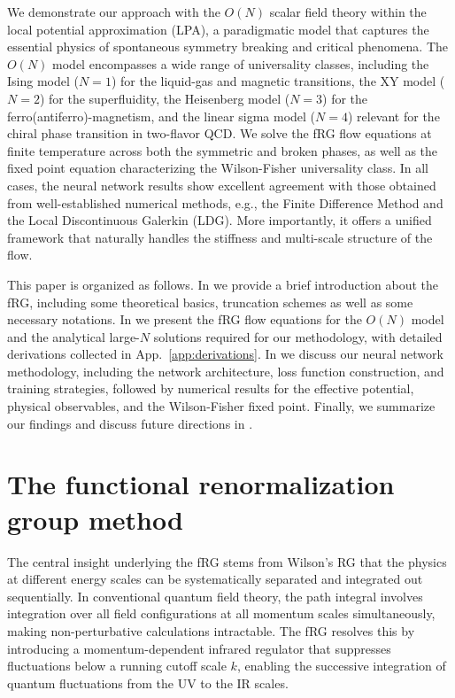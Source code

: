 \documentclass[reprint,twocolumn,superscriptaddress,preprintnumbers,amsmath,amssymb,aps,prd,floatfix]{revtex4-2}
\def\App#1{App.~\ref{#1}}
\begin{document}
We demonstrate our approach with the $O(N)$ scalar field theory within the local potential approximation (LPA), a paradigmatic model that captures the essential physics of spontaneous symmetry breaking and critical phenomena. The $O(N)$ model encompasses a wide range of universality classes, including the Ising model ($N=1$) for the liquid-gas and magnetic transitions, the XY model ($N=2$) for the superfluidity, the Heisenberg model ($N=3$) for the ferro(antiferro)-magnetism, and the linear sigma model ($N=4$) relevant for the chiral phase transition in two-flavor QCD. We solve the fRG flow equations at finite temperature across both the symmetric and broken phases, as well as the fixed point equation characterizing the Wilson-Fisher universality class. In all cases, the neural network results show excellent agreement with those obtained from well-established numerical methods, e.g., the Finite Difference Method and the Local Discontinuous Galerkin (LDG). More importantly, it offers a unified framework that naturally handles the stiffness and multi-scale structure of the flow.

This paper is organized as follows. In  we provide a brief introduction about the fRG, including some theoretical basics, truncation schemes as well as some necessary notations. In  we present the fRG flow equations for the $O(N)$ model and the analytical large-$N$ solutions required for our methodology, with detailed derivations collected in \App{app:derivations}. In  we discuss our neural network methodology, including the network architecture, loss function construction, and training strategies, followed by numerical results for the effective potential, physical observables, and the Wilson-Fisher fixed point. Finally, we summarize our findings and discuss future directions in .

\section{The functional renormalization group method}
\label{sec:fRG}
The central insight underlying the fRG stems from Wilson's RG that the physics at different energy scales can be systematically separated and integrated out sequentially. In conventional quantum field theory, the path integral involves integration over all field configurations at all momentum scales simultaneously, making non-perturbative calculations intractable. The fRG resolves this by introducing a momentum-dependent infrared regulator that suppresses fluctuations below a running cutoff scale $k$, enabling the successive integration of quantum fluctuations from the UV to the IR scales.
\end{document}
